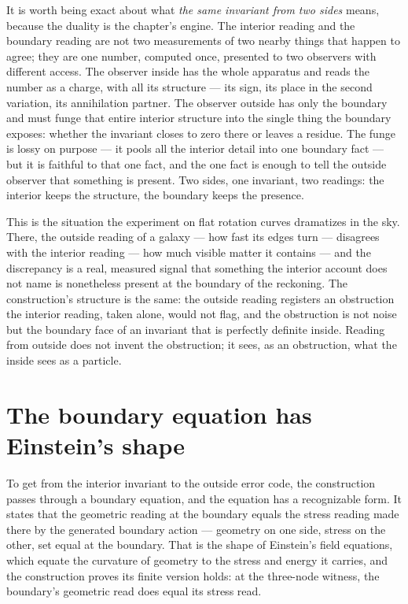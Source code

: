 It is worth being exact about what \emph{the same invariant from two sides} means, because the duality is
the chapter's engine. The interior reading and the boundary reading are not two measurements of two
nearby things that happen to agree; they are one number, computed once, presented to two observers with
different access. The observer inside has the whole apparatus and reads the number as a charge, with all
its structure --- its sign, its place in the second variation, its annihilation partner. The observer
outside has only the boundary and must funge that entire interior structure into the single thing the
boundary exposes: whether the invariant closes to zero there or leaves a residue. The funge is lossy on
purpose --- it pools all the interior detail into one boundary fact --- but it is faithful to that one
fact, and the one fact is enough to tell the outside observer that something is present. Two sides, one
invariant, two readings: the interior keeps the structure, the boundary keeps the presence.

This is the situation the experiment on flat rotation curves dramatizes in the sky. There, the outside
reading of a galaxy --- how fast its edges turn --- disagrees with the interior reading --- how much
visible matter it contains --- and the discrepancy is a real, measured signal that something the interior
account does not name is nonetheless present at the boundary of the reckoning. The construction's
structure is the same: the outside reading registers an obstruction the interior reading, taken alone,
would not flag, and the obstruction is not noise but the boundary face of an invariant that is perfectly
definite inside. Reading from outside does not invent the obstruction; it sees, as an obstruction, what
the inside sees as a particle.

\section{The boundary equation has Einstein's shape}
\label{se:the-boundary-equation-has-einsteins-shape}

To get from the interior invariant to the outside error code, the construction passes through a boundary
equation, and the equation has a recognizable form. It states that the geometric reading at the boundary
equals the stress reading made there by the generated boundary action --- geometry on one side, stress on
the other, set equal at the boundary. That is the shape of Einstein's field equations, which equate the
curvature of geometry to the stress and energy it carries, and the construction proves its finite version
holds: at the three-node witness, the boundary's geometric read does equal its stress read.

